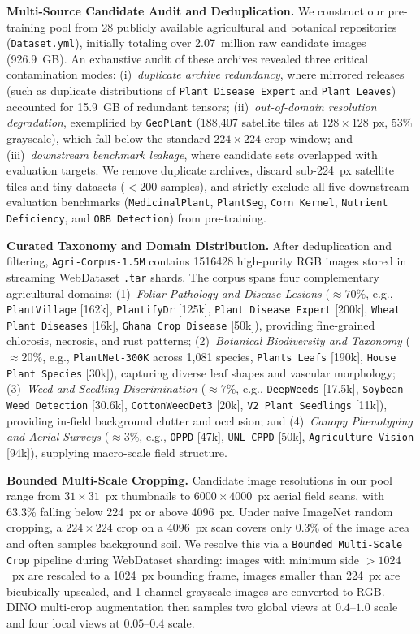 \documentclass[10pt,twocolumn,letterpaper]{article}
\begin{document}
\noindent\textbf{Multi-Source Candidate Audit and Deduplication.}
We construct our pre-training pool from 28 publicly available agricultural and botanical repositories (\texttt{Dataset.yml}), initially totaling over 2.07~million raw candidate images (926.9~GB). An exhaustive audit of these archives revealed three critical contamination modes: (i)~\emph{duplicate archive redundancy}, where mirrored releases (such as duplicate distributions of \texttt{Plant Disease Expert} and \texttt{Plant Leaves}) accounted for 15.9~GB of redundant tensors; (ii)~\emph{out-of-domain resolution degradation}, exemplified by \texttt{GeoPlant} (188,407 satellite tiles at $128{\times}128$ px, 53\% grayscale), which fall below the standard $224{\times}224$ crop window; and (iii)~\emph{downstream benchmark leakage}, where candidate sets overlapped with evaluation targets. We remove duplicate archives, discard sub-224~px satellite tiles and tiny datasets ($<200$ samples), and strictly exclude all five downstream evaluation benchmarks (\texttt{MedicinalPlant}, \texttt{PlantSeg}, \texttt{Corn Kernel}, \texttt{Nutrient Deficiency}, and \texttt{OBB Detection}) from pre-training.

\noindent\textbf{Curated Taxonomy and Domain Distribution.}
After deduplication and filtering, \texttt{Agri-Corpus-1.5M} contains \num{1516428} high-purity RGB images stored in streaming WebDataset \texttt{.tar} shards. The corpus spans four complementary agricultural domains:
(1)~\emph{Foliar Pathology and Disease Lesions} ($\approx 70\%$, e.g., \texttt{PlantVillage} [162k], \texttt{PlantifyDr} [125k], \texttt{Plant Disease Expert} [200k], \texttt{Wheat Plant Diseases} [16k], \texttt{Ghana Crop Disease} [50k]), providing fine-grained chlorosis, necrosis, and rust patterns;
(2)~\emph{Botanical Biodiversity and Taxonomy} ($\approx 20\%$, e.g., \texttt{PlantNet-300K} across 1,081 species, \texttt{Plants Leafs} [190k], \texttt{House Plant Species} [30k]), capturing diverse leaf shapes and vascular morphology;
(3)~\emph{Weed and Seedling Discrimination} ($\approx 7\%$, e.g., \texttt{DeepWeeds} [17.5k], \texttt{Soybean Weed Detection} [30.6k], \texttt{CottonWeedDet3} [20k], \texttt{V2 Plant Seedlings} [11k]), providing in-field background clutter and occlusion; and
(4)~\emph{Canopy Phenotyping and Aerial Surveys} ($\approx 3\%$, e.g., \texttt{OPPD} [47k], \texttt{UNL-CPPD} [50k], \texttt{Agriculture-Vision} [94k]), supplying macro-scale field structure.

\noindent\textbf{Bounded Multi-Scale Cropping.}
Candidate image resolutions in our pool range from $31{\times}31$~px thumbnails to $6000{\times}4000$~px aerial field scans, with 63.3\% falling below 224~px or above 4096~px. Under naive ImageNet random cropping, a $224{\times}224$ crop on a 4096~px scan covers only 0.3\% of the image area and often samples background soil. We resolve this via a \texttt{Bounded Multi-Scale Crop} pipeline during WebDataset sharding: images with minimum side $>1024$~px are rescaled to a 1024~px bounding frame, images smaller than 224~px are bicubically upscaled, and 1-channel grayscale images are converted to RGB. DINO multi-crop augmentation then samples two global views at $0.4\text{--}1.0$ scale and four local views at $0.05\text{--}0.4$ scale.
\end{document}
